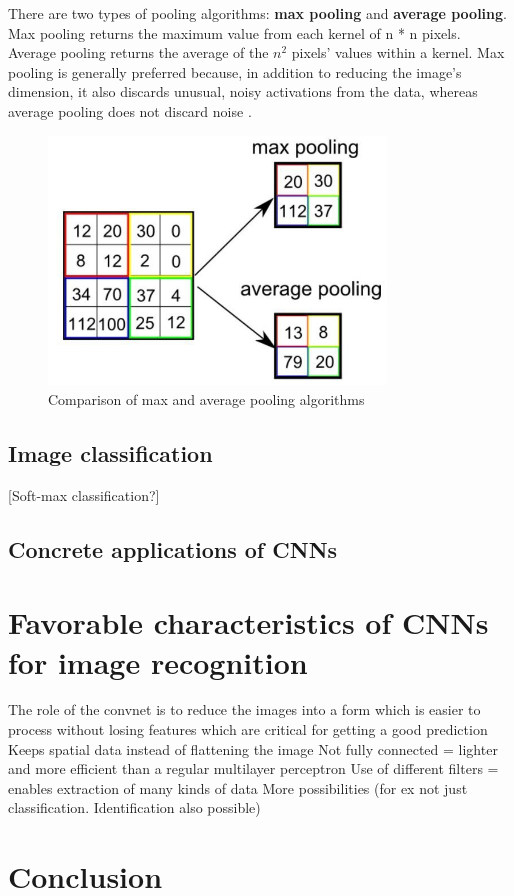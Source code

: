 \documentclass[12pt,a4paper,notitlepage]{article}
\begin{document}
There are two types of pooling algorithms: \textbf{max pooling} and \textbf{average pooling}. Max pooling returns the maximum value from each kernel of n * n pixels. Average pooling returns the average of the \(n^2\) pixels' values within a kernel. Max pooling is generally preferred because, in addition to reducing the image's dimension, it also discards unusual, noisy activations from the data, whereas average pooling does not discard noise \cite{saha_comprehensive_2018}.

\begin{figure}[htbp]
	\centering
		\includegraphics[width=0.80\textwidth]{images/pooling.jpg}
	\caption{Comparison of max and average pooling algorithms \cite{saha_comprehensive_2018}}
	\label{fig:pooling}
\end{figure}

\subsection{Image classification}
[Soft-max classification?]

\subsection{Concrete applications of CNNs}

\section{Favorable characteristics of CNNs for image recognition}
The role of the convnet is to reduce the images into a form which is easier to process without losing features which are critical for getting a good prediction \cite{saha_comprehensive_2018}
Keeps spatial data instead of flattening the image \cite{saha_comprehensive_2018}
Not fully connected = lighter and more efficient than a regular multilayer perceptron
Use of different filters = enables extraction of many kinds of data
More possibilities (for ex not just classification. Identification also possible)

\section{Conclusion}

\clearpage
\begin{flushleft}


\end{flushleft}
\end{document}
